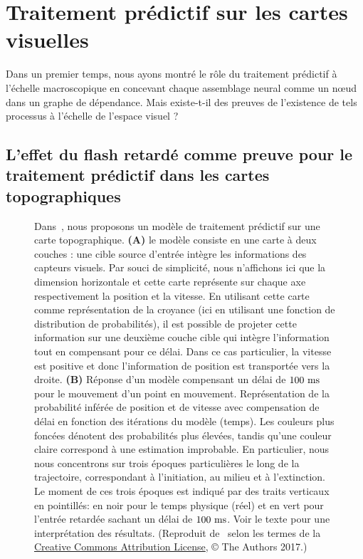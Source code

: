 \section{Traitement prédictif sur les cartes visuelles}
\label{sec:maps}
Dans un premier temps, nous ayons montré le rôle du traitement prédictif à l'échelle
macroscopique en concevant chaque assemblage neural comme un nœud dans
un graphe de dépendance. Mais existe-t-il des preuves de l'existence de tels
processus à l'échelle de l'espace visuel ?

\subsection{L'effet du flash retardé comme preuve pour le traitement
prédictif dans les cartes
topographiques}
\begin{figure}%
\caption{
Dans~\citep{KhoeiMassonPerrinet17}, nous proposons un
modèle de traitement prédictif sur une carte topographique. \textbf{(A)}
le modèle consiste en une carte à deux couches : une cible source
d'entrée intègre les informations des capteurs visuels. Par souci de
simplicité, nous n'affichons ici que la dimension horizontale et cette
carte représente sur chaque axe respectivement la position et la
vitesse. En utilisant cette carte comme représentation de la croyance
(ici en utilisant une fonction de distribution de probabilités), il est
possible de projeter cette information sur une deuxième couche cible qui
intègre l'information tout en compensant pour ce délai. Dans
ce cas particulier, la vitesse est positive et donc l'information de
position est transportée vers la droite. \textbf{(B)} Réponse d'un
modèle compensant un délai de $100~\si{\milli\second}$ pour le mouvement d'un point en mouvement.
Représentation de la probabilité inférée de position et de vitesse avec
compensation de délai en fonction des itérations du modèle (temps). Les
couleurs plus foncées dénotent des probabilités plus élevées, tandis
qu'une couleur claire correspond à une estimation improbable. En
particulier, nous nous concentrons sur trois époques particulières le
long de la trajectoire, correspondant à l'initiation, au milieu et à l'extinction.
Le moment de ces trois époques est indiqué par des traits
verticaux en pointillés: en noir pour le temps physique (réel) et en
vert pour l'entrée retardée sachant un délai de $100~\si{\milli\second}$. Voir le texte
pour une interprétation des résultats. (Reproduit de~\citep{KhoeiMassonPerrinet17} selon les termes de la
\href{https://journals.plos.org/ploscompbiol/article?id=10.1371/journal.pcbi.1005068}{Creative
Commons Attribution License}, © The Authors 2017.)
}
\label{fig:KhoeiMassonPerrinet17}
\end{figure}

